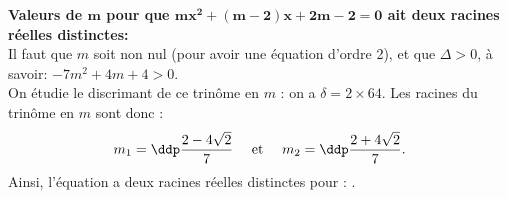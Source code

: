 
\begin{correction}  \; \textbf{Valeurs de $\mathbf{m}$ pour que $\mathbf{mx^2+(m-2)x+2m-2=0}$ ait deux racines r\'eelles distinctes:}\\
\noindent Il faut que $m$ soit non nul (pour avoir une \'equation d'ordre 2), et que $\Delta>0$, \`{a} savoir: $-7m^2+4m+4>0$. \\
On \'etudie le discrimant de ce trin\^ome en $m$ : on a $\delta = 2\times 64$. Les racines du trin\^ome en $m$ sont donc :
$$m_1=\ddp\frac{2-4\sqrt{2}}{7} \quad \textmd{ et } \quad m_2=\ddp\frac{2+4\sqrt{2}}{7}.$$ 
Ainsi, l'\'equation a deux racines r\'eelles distinctes pour : .
\end{correction}
